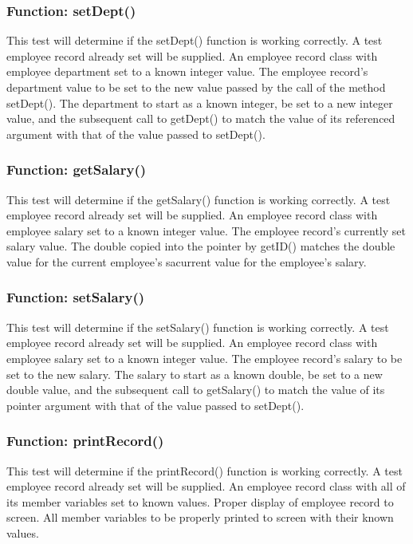 \documentclass[12pt]{article}%
\newcounter{subsubsubsection}[subsubsection]
\begin{document}
\subsubsection{Function: setDept()}
This test will determine if the setDept() function is working correctly. A test
employee record already set will be supplied.
An employee record class with employee department set to a known integer value.
The employee record's department value to be set to the new value passed by the call of the method
setDept().
The department to start as a known integer, be set to a new integer value, and the subsequent call
to getDept() to match the value of its referenced argument with that of the value passed to setDept().

\subsubsection{Function: getSalary()}
This test will determine if the getSalary() function is working correctly. A test
employee record already set will be supplied.
An employee record class with employee salary set to a known integer value.
The employee record's currently set salary value.
The double copied into the pointer by getID() matches the double value for the current employee's sacurrent value for the employee's salary.

\subsubsection{Function: setSalary()}
This test will determine if the setSalary() function is working correctly. A test
employee record already set will be supplied.
An employee record class with employee salary set to a known integer value.
The employee record's salary to be set to the new salary.
The salary to start as a known double, be set to a new double value, and the subsequent call
to getSalary() to match the value of its pointer argument with that of the value passed to setDept().

\subsubsection{Function: printRecord()}
This test will determine if the printRecord() function is working correctly. A test
employee record already set will be supplied.
An employee record class with all of its member variables set to known values.
Proper display of employee record to screen.
All member variables to be properly printed to screen with their known values.
\end{document}
